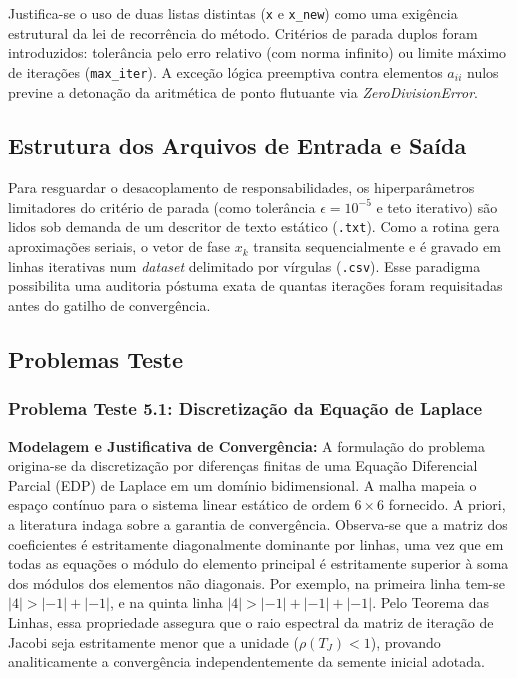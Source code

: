 Justifica-se o uso de duas listas distintas (\texttt{x} e \texttt{x\_new}) como uma exigência estrutural da lei de recorrência do método. Critérios de parada duplos foram introduzidos: tolerância pelo erro relativo (com norma infinito) ou limite máximo de iterações (\texttt{max\_iter}). A exceção lógica preemptiva contra elementos $a_{ii}$ nulos previne a detonação da aritmética de ponto flutuante via \textit{ZeroDivisionError}.

\subsection{Estrutura dos Arquivos de Entrada e Saída}

Para resguardar o desacoplamento de responsabilidades, os hiperparâmetros limitadores do critério de parada (como tolerância $\epsilon = 10^{-5}$ e teto iterativo) são lidos sob demanda de um descritor de texto estático (\texttt{.txt}). Como a rotina gera aproximações seriais, o vetor de fase $x_k$ transita sequencialmente e é gravado em linhas iterativas num \textit{dataset} delimitado por vírgulas (\texttt{.csv}). Esse paradigma possibilita uma auditoria póstuma exata de quantas iterações foram requisitadas antes do gatilho de convergência.

\subsection{Problemas Teste}

\subsubsection{Problema Teste 5.1: Discretização da Equação de Laplace}

\textbf{Modelagem e Justificativa de Convergência:} A formulação do problema origina-se da discretização por diferenças finitas de uma Equação Diferencial Parcial (EDP) de Laplace em um domínio bidimensional. A malha mapeia o espaço contínuo para o sistema linear estático de ordem $6 \times 6$ fornecido. A priori, a literatura indaga sobre a garantia de convergência. Observa-se que a matriz dos coeficientes é estritamente diagonalmente dominante por linhas, uma vez que em todas as equações o módulo do elemento principal é estritamente superior à soma dos módulos dos elementos não diagonais. Por exemplo, na primeira linha tem-se $|4| > |-1| + |-1|$, e na quinta linha $|4| > |-1| + |-1| + |-1|$. Pelo Teorema das Linhas, essa propriedade assegura que o raio espectral da matriz de iteração de Jacobi seja estritamente menor que a unidade ($\rho(T_J) < 1$), provando analiticamente a convergência independentemente da semente inicial adotada.


